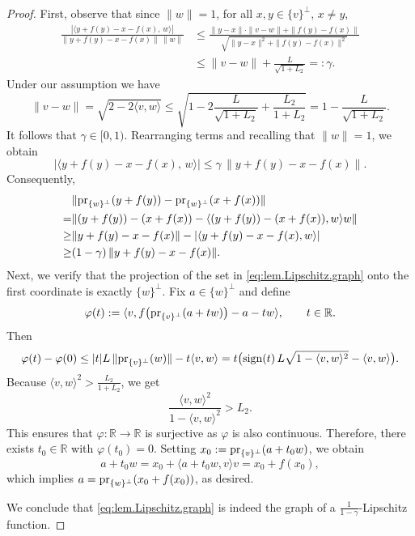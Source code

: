 \documentclass[a4paper]{amsart}
\numberwithin{theorem}{section}
\theoremstyle{definition}
\renewcommand{\phi}{\varphi}
\begin{document}
\begin{proof}
    First, observe that since $\|w\| = 1$, for all $x,y \in \{ v\}^\perp$, $x \neq y$,
    \begin{align*}
        \frac{|\langle y + f(y) - x - f(x), \, w \rangle|}{\|y + f(y) - x - f(x)\| \, \|w\|} 
        &\le \frac{\|y - x\| \cdot \|v - w \| + \|f(y) - f(x)\|}{\sqrt{\|y-x\|^2 + \|f(y) - f(x)\|^2}} \\
        &\le \|v - w\| + \frac{L}{\sqrt{1 + L_2}} =: \gamma.
    \end{align*}
    Under our assumption we have
    \[
        \|v-w\| = \sqrt{2 - 2 \langle v,w \rangle} \le \sqrt{1 - 2 \frac{L}{\sqrt{1 + L_2}} + \frac{L_2}{1 + L_2}} = 1 - \frac{L}{\sqrt{1 + L_2}}.
    \]
    It follows that $\gamma \in [0,1)$.
    Rearranging terms and recalling that $\|w\|=1$, we obtain
    \[
        |\langle y + f(y) - x - f(x), \, w \rangle| \le \gamma \, \|y + f(y) - x - f(x)\|.
    \]
    Consequently,
    \begin{align*}
       & \| {\rm pr}_{\{ w \}^\perp }(y + f(y)) - {\rm pr}_{\{ w \}^\perp }(x + f(x)) \| \\
        = & \| (y + f(y)) - (x + f(x)) - \langle (y + f(y)) - (x + f(x)), w \rangle w \| \\
        \ge & \| y + f(y) - x - f(x) \| - |\langle y + f(y) - x - f(x), w \rangle| \\
        \ge & (1 - \gamma) \, \| y + f(y) - x - f(x) \|.
    \end{align*}
   Next, we verify that the projection of the set in \eqref{eq:lem.Lipschitz.graph} onto the first coordinate is exactly $\{ w \}^\perp$.
    Fix $a \in \{ w \}^\perp$ and define
    \[
        \phi(t) := 
        \langle v, f\big( {\rm pr}_{\{ v \}^\perp }(a + tw)\big) - a - tw \rangle, \qquad t \in \mathbb R.
    \]
    Then
    \[
        \phi(t) - \phi(0) 
        \le |t| L \, \| {\rm pr}_{\{v\}^\perp }(w) \| - t \langle v,w \rangle 
        = t \big( {\rm sign}(t) \, L \sqrt{1 - \langle v,w \rangle^2} - \langle v,w \rangle \big).
    \]
    Because $\langle v,w \rangle^2 > \tfrac{L_2}{ 1 + L_2 }$, we get 
    \[
        \frac{\langle v,w \rangle^2}{1 - \langle v,w \rangle^2} > L_2.
    \]
    This ensures that $\phi : \mathbb R \to \mathbb R$ is surjective as $\phi$ is also continuous.
    Therefore, there exists $t_0 \in \mathbb R$ with $\phi(t_0) = 0$.
    Setting $x_0 := {\rm pr}_{ \{ v \}^\perp }(a + t_0 w)$, we obtain
    \[
        a + t_0 w = x_0 + \langle a + t_0 w, v\rangle v = x_0 + f(x_0),
    \]
    which implies $a = {\rm pr}_{ \{ w \}^\perp }(x_0 + f(x_0))$, as desired.
    
    We conclude that \eqref{eq:lem.Lipschitz.graph} is indeed the graph of a $\tfrac{1}{1 - \gamma}$-Lipschitz function.
\end{proof}
\end{document}
